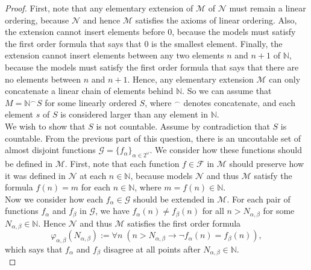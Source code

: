 \documentclass{article}
\begin{document}
\begin{enumerate}[label={\bf Q\arabic*:}]
\begin{enumerate}
        \begin{proof}
          First, note that any elementary extension of $\mathcal{M}$ of
          $\mathcal{N}$ must remain a linear ordering, because
          $\mathcal{N}$ and hence $\mathcal{M}$ satisfies the axioms of
          linear ordering. Also, the extension cannot insert elements
          before $0$, because the models must satisfy the first order
          formula that says that $0$ is the smallest element. Finally, the
          extension cannot insert elements between any two elements $n$ and
          $n+1$ of $\mathbb{N}$, because the models must satisfy the first
          order formula that says that there are no elements between $n$
          and $n+1$. Hence, any elementary extension $\mathcal{M}$ can only
          concatenate a linear chain of elements behind $\mathbb{N}$. So we
          can assume that $M=\mathbb{N}^\frown S$ for some linearly ordered
          $S$, where $^\frown$ denotes concatenate, and each element $s$ of
          $S$ is considered larger than any element in $\mathbb{N}$. \\

          We wish to show that $S$ is not countable. Assume by
          contradiction that $S$ is countable. From the previous part of
          this question, there is an uncoutable set of almost disjoint
          functions $\mathcal{G}=\{f_{\alpha}\}_{\alpha\in2^\omega}$. We
          consider how these functions should be defined in $\mathcal{M}$.
          First, note that each function $f\in\mathcal{F}$ in $\mathcal{M}$
          should preserve how it was defined in $\mathcal{N}$ at each
          $n\in\mathbb{N}$, because models $\mathcal{N}$ and thus
          $\mathcal{M}$ satisfy the formula $f(n)=m$ for each
          $n\in\mathbb{N}$, where $m=f(n)\in\mathbb{N}$.  \\

          Now we consider how each $f_\alpha\in\mathcal{G}$ should be
          extended in $\mathcal{M}$. For each pair of functions $f_\alpha$
          and $f_\beta$ in $\mathcal{G}$, we have $f_\alpha(n)\neq
          f_\beta(n)$ for all $n>N_{\alpha,\beta}$ for some
          $N_{\alpha,\beta}\in\mathbb{N}$.  Hence $\mathcal{N}$ and thus
          $\mathcal{M}$ satisfies the first order formula
          \begin{equation*}
            \varphi_{\alpha,\beta}(N_{\alpha,\beta}) := \forall n\;
            (n>N_{\alpha,\beta}\rightarrow \neg f_\alpha(n)=f_\beta(n)),
          \end{equation*}
          which says that $f_\alpha$ and $f_\beta$ disagree at all points
          after $N_{\alpha,\beta}\in\mathbb{N}$. \\


\end{proof}
\end{enumerate}
\end{enumerate}
\end{document}

